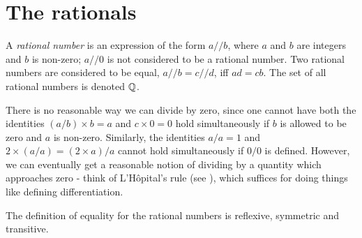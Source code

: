 \section{The rationals}\label{i:sec:4.2}

\begin{defn}\label{i:4.2.1}
  A \emph{rational number} is an expression of the form \(a // b\), where \(a\) and \(b\) are integers and \(b\) is non-zero;
  \(a // 0\) is not considered to be a rational number.
  Two rational numbers are considered to be equal, \(a // b = c // d\), iff \(ad = cb\).
  The set of all rational numbers is denoted \(\mathbb{Q}\).
\end{defn}

\begin{note}
  There is no reasonable way we can divide by zero, since one cannot have both the identities \((a / b) \times b = a\) and \(c \times 0 = 0\) hold simultaneously if \(b\) is allowed to be zero and \(a\) is non-zero.
  Similarly, the identities \(a / a = 1\) and \(2 \times (a / a) = (2 \times a) / a\) cannot hold simultaneously if \(0 / 0\) is defined.
  However, we can eventually get a reasonable notion of dividing by a quantity which approaches zero
  - think of L'H\^opital's rule (see ), which suffices for doing things like defining differentiation.
\end{note}

\begin{ac}\label{i:ac:4.2.1}
  The definition of equality for the rational numbers is reflexive, symmetric and transitive.
\end{ac}

